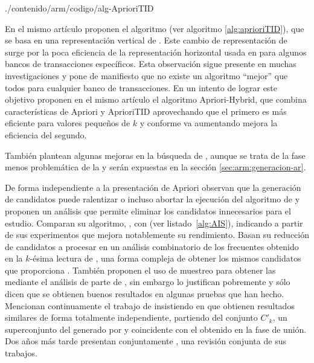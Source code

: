 
                 {./contenido/arm/codigo/alg-AprioriTID}

En el mismo artículo proponen el algoritmo  (ver algoritmo \ref{alg:aprioriTID}), que se basa en una representación vertical de \D. Este cambio de representación de \D surge por la poca eficiencia de la representación horizontal usada en \apriori para algunos bancos de transacciones específicos. Esta observación sigue presente en muchas investigaciones y pone de manifiesto que no existe un algoritmo "`mejor"' que todos para cualquier banco de transacciones. En un intento de lograr este objetivo proponen en el mismo artículo el algoritmo {Apriori-Hybrid}, que combina características de Apriori y {AprioriTID} aprovechando que el primero es más eficiente para valores pequeños de $k$ y conforme va aumentando mejora la eficiencia del segundo.

También plantean algunas mejoras en la búsqueda de \ars, aunque se trata de la fase menos problemática de la \ARM y serán expuestas en la sección \ref{sec:arm:generacion-ar}.


De forma independiente a la presentación de Apriori \citet{MannilaToivonenVerkamo-EfficientAlgorithmsForDiscoveringAR-1994} observan que la generación de candidatos puede ralentizar o incluso abortar la ejecución del algoritmo de \ARM y proponen un análisis que permite eliminar los candidatos innecesarios para el estudio. Comparan su algoritmo, , con  (ver listado~\ref{alg:AIS}), indicando a partir de sus experimentos que mejora notablemente su rendimiento. Basan su reducción de candidatos a procesar en un análisis combinatorio de los \kitemsets frecuentes obtenido en la $k$-ésima lectura de \D, una forma compleja de obtener los mismos candidatos que proporciona \apriori. También proponen el uso de muestreo para obtener las \ars mediante el análisis de parte de \D, sin embargo lo justifican pobremente y sólo dicen que se obtienen buenos resultados en algunas pruebas que han hecho. Mencionan continuamente el trabajo de \citet{AgrawalSrikant-FastAlgorithmsForMiningAssociationRules-1994} insistiendo en que obtienen resultados similares de forma totalmente independiente, partiendo del conjunto ${C'}_k$, un superconjunto del generado por \apriori y coincidente con el obtenido en la fase de unión. Dos años más tarde presentan conjuntamente \citet{AgrawalMannilaSrikantToivonenVerkamo-FastDiscoveryOfAR-1996}, una revisión conjunta de sus trabajos.


